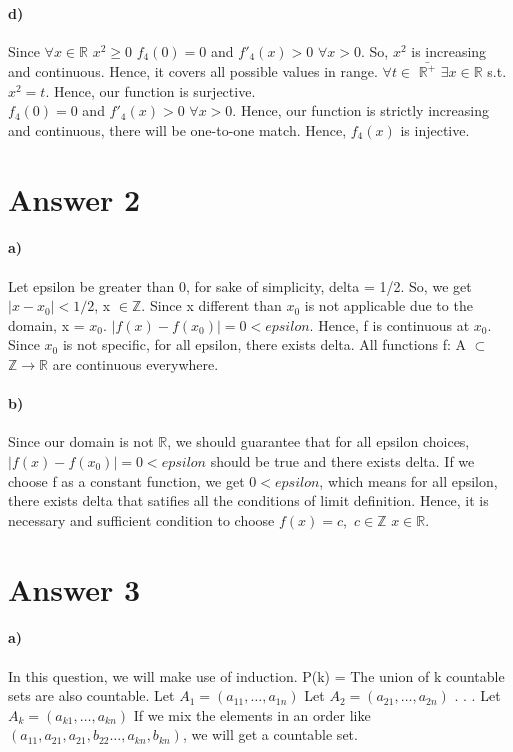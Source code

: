 \documentclass[12pt]{article}
\begin{document}
\paragraph{d)} Since $\forall x \in \mathbb{R}$ $x^2 \geq 0$ $f_4(0) = 0$ and $f'_4(x) > 0$ $\forall x > 0$. So, $x^2$ is increasing and continuous. Hence, it covers all possible values in range.  $\forall t\in $ $\bar{\mathbb{R}^+}$ $\exists x \in \mathbb{R}$ s.t.  $x^2 = t$. Hence, our function is surjective. \\

$f_4(0) = 0$ and $f'_4(x) > 0$ $\forall x > 0$. Hence, our function is strictly increasing and continuous, there will be one-to-one match. Hence, $f_4(x)$ is injective.\\ 

\section*{Answer 2}
\paragraph{a)} Let epsilon be greater than 0, for sake of simplicity, delta = 1/2. So, we get $|x - x_0| < 1/2$, x $\in \mathbb{Z}$. Since x different than $x_0$ is not applicable due to the domain, x = $x_0$. $|f(x) - f(x_0)| = 0 < epsilon$. Hence, f is continuous at $x_0$. Since $x_0$ is not specific, for all epsilon, there exists delta. All functions f: A $\subset$ $\mathbb{Z} \rightarrow \mathbb{R}$ are continuous everywhere.

\paragraph{b)} Since our domain is not $\mathbb{R}$, we should guarantee that for all epsilon choices, $|f(x) - f(x_0)| = 0 < epsilon$ should be true and there exists delta. If we choose f as a constant function, we get $0 < epsilon$, which means for all epsilon, there exists delta that satifies all the conditions of limit definition. Hence, it is necessary and sufficient condition to choose $f(x) = c,$ $c \in \mathbb{Z}$ $x \in \mathbb{R}$.

\section*{Answer 3}
\paragraph{a)} In this question, we will make use of induction. 
P(k) = The union of k countable sets are also countable.
Let $A_1 = (a_{11}, \ldots, a_{1n})$
Let $A_2 = (a_{21}, \ldots, a_{2n})$
.
.
.
Let $A_k = (a_{k1}, \ldots, a_{kn})$
If we mix the elements in an order like $(a_{11}, a_{21}, a_{21}, b_{22} \ldots, a_{kn}, b_{kn})$, we will get a countable set.
\end{document}
